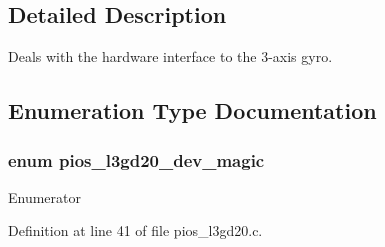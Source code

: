 \subsection{Detailed Description}
Deals with the hardware interface to the 3-\/axis gyro. 

\subsection{Enumeration Type Documentation}
\hypertarget{group___p_i_o_s___l3_g_d20_ga34e70adc9970e3e83c4d39e720087df3}{
\subsubsection[{pios\-\_\-l3gd20\-\_\-dev\-\_\-magic}]{\setlength{\rightskip}{0pt plus 5cm}enum {\bf pios\-\_\-l3gd20\-\_\-dev\-\_\-magic}}}\label{group___p_i_o_s___l3_g_d20_ga34e70adc9970e3e83c4d39e720087df3}
\begin{Desc}
\item[Enumerator]\par
\begin{description}
\item[{\em 
\hypertarget{group___p_i_o_s___l3_g_d20_gga34e70adc9970e3e83c4d39e720087df3a8ff24655b5a2966b5bdf02704790f7c1}{P\-I\-O\-S\-\_\-\-L3\-G\-D20\-\_\-\-D\-E\-V\-\_\-\-M\-A\-G\-I\-C}\label{group___p_i_o_s___l3_g_d20_gga34e70adc9970e3e83c4d39e720087df3a8ff24655b5a2966b5bdf02704790f7c1}
}]\end{description}
\end{Desc}


Definition at line 41 of file pios\-\_\-l3gd20.\-c.

